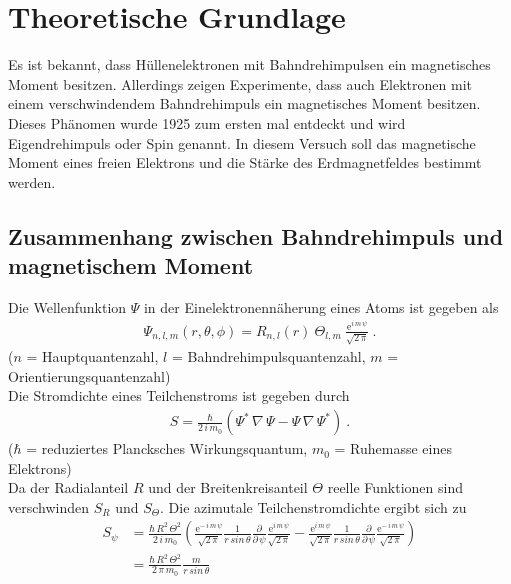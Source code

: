 \section{Theoretische Grundlage}
\label{sec:Theorie}
Es ist bekannt, dass Hüllenelektronen mit Bahndrehimpulsen ein magnetisches Moment besitzen. Allerdings zeigen Experimente, dass auch Elektronen mit einem verschwindendem Bahndrehimpuls ein magnetisches Moment besitzen. Dieses Phänomen wurde 1925 zum ersten mal entdeckt und wird Eigendrehimpuls oder Spin genannt. In diesem Versuch soll das magnetische Moment eines freien Elektrons und die Stärke des Erdmagnetfeldes bestimmt werden.



\subsection{Zusammenhang zwischen Bahndrehimpuls und magnetischem Moment}
Die Wellenfunktion $\Psi$ in der Einelektronennäherung eines Atoms ist gegeben als
\begin{align}
	\Psi_{n,l,m}(r,\theta,\phi) = R_{n,l}(r)\ \Theta_{l,m}\ \frac{\text{e}^{i\,m\,\psi}}{\sqrt{2\,\pi}} \ .
\end{align}
\hfill {\footnotesize($n$ = Hauptquantenzahl, $l$ = Bahndrehimpulsquantenzahl, $m$ = Orientierungsquantenzahl)} \hfill \vspace{0.25cm}\\
Die Stromdichte eines Teilchenstroms ist gegeben durch
\begin{align}
	S = \frac{\hbar}{2\,i\,m_0}\left( \Psi^*\,\nabla\,\Psi - \Psi\,\nabla\,\Psi^* \right) \ .
\end{align}
\hfill {\footnotesize($\hbar$ = reduziertes Plancksches Wirkungsquantum, $m_0$ = Ruhemasse eines Elektrons)} \hfill \vspace{0.25cm}\\
Da der Radialanteil $R$ und der Breitenkreisanteil $\Theta$ reelle Funktionen sind verschwinden $S_R$ und $S_\Theta$. Die azimutale Teilchenstromdichte ergibt sich zu
\begin{align}\label{eqn:aS} %
	S_\psi &= \frac{\hbar\,R^2\,\Theta^2}{2\,i\,m_0} \left( \frac{\text{e}^{-\,i\,m\,\psi}}{\sqrt{2\,\pi}} \frac{1}{r\,sin\,\theta} \frac{\partial}{\partial\,\psi} \frac{\text{e}^{i\,m\,\psi}}{\sqrt{2\,\pi}} - \frac{\text{e}^{i\,m\,\psi}}{\sqrt{2\,\pi}} \frac{1}{r\,sin\,\theta} \frac{\partial}{\partial\,\psi} \frac{\text{e}^{-\,i\,m\,\psi}}{\sqrt{2\,\pi}} \right) \nonumber \\
	&= \frac{\hbar\,R^2\,\Theta^2}{2\,\pi\,m_0}\frac{m}{r\,sin\,\theta}
\end{align}
